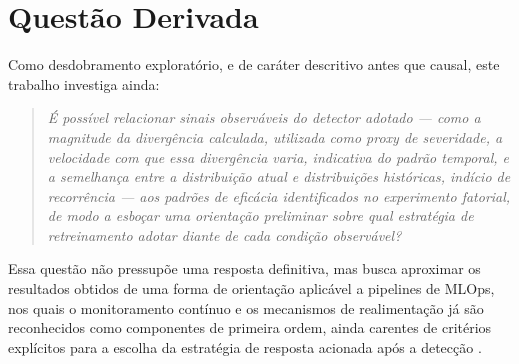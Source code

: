 \section{Questão Derivada}

Como desdobramento exploratório, e de caráter descritivo antes que causal,
este trabalho investiga ainda:

\begin{quote}
\textit{É possível relacionar sinais observáveis do detector adotado — como
a magnitude da divergência calculada, utilizada como proxy de severidade, a
velocidade com que essa divergência varia, indicativa do padrão temporal, e
a semelhança entre a distribuição atual e distribuições históricas, indício
de recorrência — aos padrões de eficácia identificados no experimento
fatorial, de modo a esboçar uma orientação preliminar sobre qual estratégia
de retreinamento adotar diante de cada condição observável?}
\end{quote}

Essa questão não pressupõe uma resposta definitiva, mas busca aproximar os
resultados obtidos de uma forma de orientação aplicável a pipelines de
MLOps, nos quais o monitoramento contínuo e os mecanismos de realimentação
já são reconhecidos como componentes de primeira ordem, ainda carentes de
critérios explícitos para a escolha da estratégia de resposta acionada após
a detecção \cite{kreuzberger2023}.